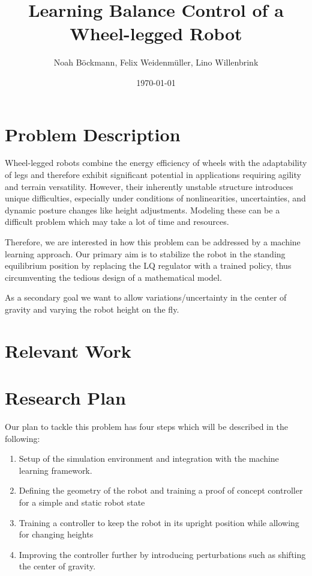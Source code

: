 \documentclass[a4paper]{article}
\title{Learning Balance Control of a Wheel-legged Robot}
\author{Noah Böckmann, Felix Weidenmüller, Lino Willenbrink}
\date{\today}
\begin{document}
\maketitle
\section{Problem Description}
Wheel-legged robots combine the energy efficiency of wheels with the adaptability of legs and
therefore exhibit significant potential in applications requiring agility and terrain versatility.
However, their inherently unstable structure introduces unique difficulties, especially under
conditions of nonlinearities, uncertainties, and dynamic posture changes like height adjustments.
Modeling these can be a difficult problem which may take a lot of time and resources.

Therefore, we are interested in how this problem can be addressed by a machine learning approach.
Our primary aim is to stabilize the robot in the standing equilibrium position by replacing the LQ
regulator with a trained policy, thus circumventing the tedious design of a mathematical model.

As a secondary goal we want to allow variations/uncertainty in the center of gravity and varying the
robot height on the fly.

\section{Relevant Work}

\section{Research Plan}
Our plan to tackle this problem has four steps which will be described in the following:
\begin{enumerate}
  \item Setup of the simulation environment and integration with the machine learning framework.
  \item Defining the geometry of the robot and training a proof of concept controller for a simple
        and static robot state
  \item Training a controller to keep the robot in its upright position while allowing for changing heights
  \item Improving the controller further by introducing perturbations such as shifting the center of
        gravity.
\end{enumerate}
\end{document}
